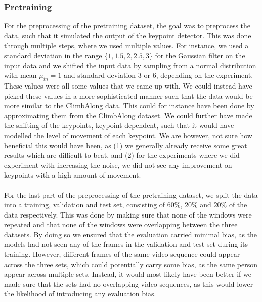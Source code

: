 \documentclass[./main.tex]{subfiles}
\begin{document}
\subsubsection{Pretraining}
For the preprocessing of the pretraining dataset, the goal was to preprocess the data, such that it simulated the output of the keypoint detector. This was done through multiple steps, where we used multiple values. For instance, we used a standard deviation in the range $\{1, 1.5, 2, 2.5, 3\}$ for the Gaussian filter on the input data and we shifted the input data by sampling from a normal distribution with mean $\mu_{in} = 1$ and standard deviation $3$ or $6$, depending on the experiment. These values were all some values that we came up with. We could instead have picked these values in a more sophisticated manner such that the data would be more similar to the ClimbAlong data. This could for instance have been done by approximating them from the ClimbAlong dataset. We could further have made the shifting of the keypoints, keypoint-dependent, such that it would have modelled the level of movement of each keypoint. We are however, not sure how beneficial this would have been, as (1) we generally already receive some great results which are difficult to beat, and (2) for the experiments where we did experiment with increasing the noise, we did not see any improvement on keypoints with a high amount of movement.
\\
\\
For the last part of the preprocessing of the pretraining dataset, we split the data into a training, validation and test set, consisting of $60\%$, $20\%$ and $20\%$ of the data respectively. This was done by making sure that none of the windows were repeated and that none of the windows were overlapping between the three datasets. By doing so we ensured that the evaluation carried minimal bias, as the models had not seen any of the frames in the validation and test set during its training. However, different frames of the same video sequence could appear across the three sets, which could potentially carry some bias, as the same person appear across multiple sets. Instead, it would most likely have been better if we made sure that the sets had no overlapping video sequences, as this would lower the likelihood of introducing any evaluation bias.
\end{document}
